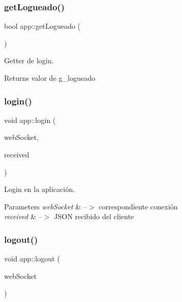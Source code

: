 \subsubsection{\texorpdfstring{get\+Logueado()}{getLogueado()}}
{\footnotesize\ttfamily bool app\+::get\+Logueado (\begin{DoxyParamCaption}{ }\end{DoxyParamCaption})}



Getter de login. 

\begin{DoxyReturn}{Returns}
valor de g\+\_\+logueado 
\end{DoxyReturn}
\mbox{\label{classapp_a0bb96ab42618921392ac30e13444391c}} 
\subsubsection{\texorpdfstring{login()}{login()}}
{\footnotesize\ttfamily void app\+::login (\begin{DoxyParamCaption}\item[{ix\+::\+Web\+Socket $\ast$}]{web\+Socket,  }\item[{J\+S\+ON}]{received }\end{DoxyParamCaption})}



Login en la aplicación. 


\begin{DoxyParams}{Parameters}
{\em web\+Socket} & --$>$ correspondiente conexión \\
\hline
{\em received} & --$>$ J\+S\+ON recibido del cliente \\
\hline
\end{DoxyParams}
\mbox{\label{classapp_a93176ba428640e16ea767d95319ce0c2}} 
\subsubsection{\texorpdfstring{logout()}{logout()}}
{\footnotesize\ttfamily void app\+::logout (\begin{DoxyParamCaption}\item[{ix\+::\+Web\+Socket $\ast$}]{web\+Socket }\end{DoxyParamCaption})}



